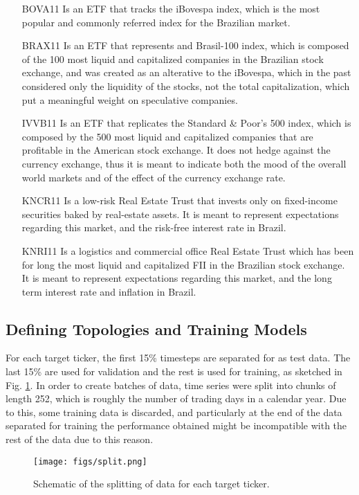 \documentclass[conference]{IEEEtran}
\begin{document}
\begin{itemize}
    \item[	BOVA11] Is an ETF that tracks the iBovespa index, which is the most popular and commonly referred index for the Brazilian market.
    \item[	BRAX11] Is an ETF that represents and Brasil-100 index, which is composed of the 100 most liquid and capitalized companies in the Brazilian stock exchange, and was created as an alterative to the iBovespa, which in the past considered only the liquidity of the stocks, not the total capitalization, which put a meaningful weight on speculative companies.
    \item[	IVVB11] Is an ETF that replicates the Standard \& Poor's 500 index, which is composed by the 500 most liquid and capitalized companies that are profitable in the American stock exchange. It does not hedge against the currency exchange, thus it is meant to indicate both the mood of the overall world markets and of the effect of the currency exchange rate.
    \item[	KNCR11] Is a low-risk Real Estate Trust that invests only on fixed-income securities baked by real-estate assets. It is meant to represent expectations regarding this market, and the risk-free interest rate in Brazil.
    \item[	KNRI11] Is a logistics and commercial office Real Estate Trust which has been for long the most liquid and capitalized FII in the Brazilian stock exchange. It is meant to represent expectations regarding this market, and the long term interest rate and inflation in Brazil.    
\end{itemize}



\subsection{Defining Topologies and Training Models}
For each target ticker, the first 15\% timesteps are separated for as test data. The last 15\% are used for validation and the rest is used for training, as sketched in Fig. \ref{fig:split}. In order to create batches of data, time series were split into chunks of length 252, which is roughly the number of trading days in a calendar year. Due to this, some training data is discarded, and particularly at the end of the data separated for training the performance obtained might be incompatible with the rest of the data due to this reason.

\begin{figure}[htbp]
    \centerline{\texttt{[image: figs/split.png]}}
    \caption{Schematic of the splitting of data for each target ticker.}
    \label{fig:split}
\end{figure}
\end{document}
